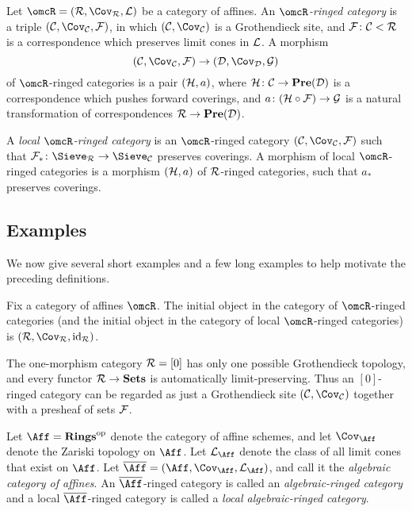\documentclass[10pt]{amsart}
\begin{document}
\begin{definition}\label{ringed cat}

Let $\omcR=(\mcR,\Cov_\mcR,\mcL)$ be a category of affines.  An {\em $\omcR$-ringed category} is a triple $(\mcC,\Cov_\mcC,\mcF)$, in which $(\mcC,\Cov_\mcC)$ is a Grothendieck site, and $\mathcal{F}\colon\mathcal{C}<\mathcal{R}$ is a correspondence which preserves limit cones in $\mathcal{L}$.  A morphism $$(\mcC,\Cov_\mcC,\mcF)\to(\mcD,\Cov_\mcD,\mcG)$$ of $\omcR$-ringed categories is a pair $(\mathcal{H},a)$, where $\mathcal{H}\colon\mathcal{C}\rightarrow{\bf Pre}(\mathcal{D})$ is a correspondence which pushes forward coverings, and $a\colon(\mathcal{H}\circ\mathcal{F})\rightarrow\mathcal{G}$ is a natural transformation of correspondences $\mathcal{R}\rightarrow{\bf Pre}(\mathcal{D})$.

A {\em local $\omcR$-ringed category} is an $\omcR$-ringed category $(\mcC,\Cov_\mcC,\mcF)$ such that $\mcF_*\taking\Sieve_\mcR\to\Sieve_\mcC$ preserves coverings.  A morphism of local $\omcR$-ringed categories is a morphism $(\mathcal{H},a)$ of $\mathcal{R}$-ringed categories, such that $a_*$ preserves coverings.

\end{definition}

\subsection{Examples}

We now give several short examples and a few long examples to help motivate the preceding definitions.

\begin{example}

Fix a category of affines $\omcR$.  The initial object in the category of $\omcR$-ringed categories (and the initial object in the category of local $\omcR$-ringed categories) is $(\mcR,\Cov_\mcR,\id_\mcR)$.

\end{example}

\begin{example}

The one-morphism category $\mathcal{R}=[0]$ has only one possible Grothendieck topology, and every functor $\mathcal{R}\rightarrow{\bf Sets}$ is automatically limit-preserving.  Thus an $[0]$-ringed category can be regarded as just a Grothendieck site $(\mcC,\Cov_\mcC)$ together with a presheaf of sets $\mathcal{F}$.

\end{example}

\begin{definition}

Let $\Aff=\Rings\op$ denote the category of affine schemes, and let $\Cov_\Aff$ denote the Zariski topology on $\Aff$.  Let $\mcL_\Aff$ denote the class of all limit cones that exist on $\Aff$.  Let $\ol{\Aff}=(\Aff,\Cov_\Aff,\mcL_\Aff)$, and call it the {\em algebraic category of affines}.  An $\ol{\Aff}$-ringed category is called an {\em algebraic-ringed category} and a local $\ol{\Aff}$-ringed category is called a {\em local algebraic-ringed category}.

\end{definition}
\end{document}
